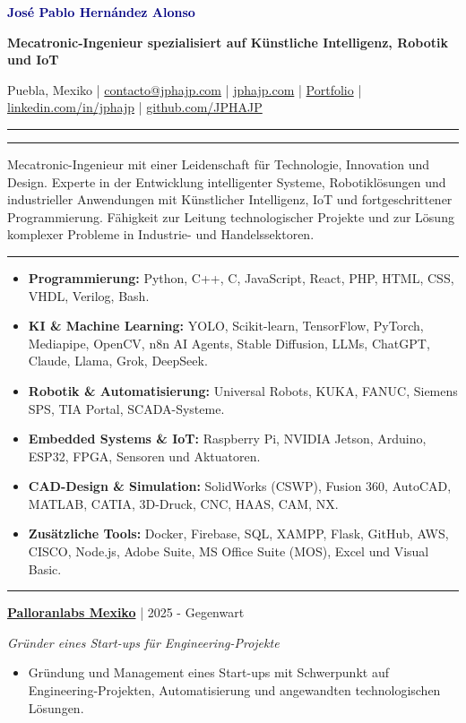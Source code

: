 \documentclass[10pt,letterpaper]{article}
\newcommand{\sectionline}{\vspace{-2pt}\textcolor{accent}{\rule{\linewidth}{0.8pt}}\vspace{1pt}}
\newcommand{\cvsection}[1]{\vspace{5pt}{\large\bfseries\textcolor{navy}{#1}}\par\sectionline}
\newcommand{\entry}[3]{\textbf{#1} \textcolor{muted}{| #2}\par\textit{#3}\par}
\begin{document}
\color{text}

{\Huge\bfseries\textcolor{navy}{Jos\'{e} Pablo Hern\'{a}ndez Alonso}}\par
{\large\bfseries Mecatronic-Ingenieur spezialisiert auf K\"{u}nstliche Intelligenz, Robotik und IoT}\par
\vspace{2pt}
Puebla, Mexiko \; | \; \href{mailto:contacto@jphajp.com}{contacto@jphajp.com} \; | \; \href{https://jphajp.com/}{jphajp.com} \; | \; \href{https://jphajp.github.io/JPHAJP/}{Portfolio} \; | \; \href{https://www.linkedin.com/in/jphajp}{linkedin.com/in/jphajp} \; | \; \href{https://github.com/JPHAJP}{github.com/JPHAJP}
\par\vspace{3pt}\textcolor{accent}{\rule{\linewidth}{1.8pt}}

\cvsection{Berufsprofil}
Mecatronic-Ingenieur mit einer Leidenschaft f\"{u}r Technologie, Innovation und Design. Experte in der Entwicklung intelligenter Systeme, Robotikl\"{o}sungen und industrieller Anwendungen mit K\"{u}nstlicher Intelligenz, IoT und fortgeschrittener Programmierung. F\"{a}higkeit zur Leitung technologischer Projekte und zur L\"{o}sung komplexer Probleme in Industrie- und Handelssektoren.

\cvsection{Technische Kompetenzen}
\begin{itemize}
  \item \textbf{Programmierung:} Python, C++, C, JavaScript, React, PHP, HTML, CSS, VHDL, Verilog, Bash.
  \item \textbf{KI \& Machine Learning:} YOLO, Scikit-learn, TensorFlow, PyTorch, Mediapipe, OpenCV, n8n AI Agents, Stable Diffusion, LLMs, ChatGPT, Claude, Llama, Grok, DeepSeek.
  \item \textbf{Robotik \& Automatisierung:} Universal Robots, KUKA, FANUC, Siemens SPS, TIA Portal, SCADA-Systeme.
  \item \textbf{Embedded Systems \& IoT:} Raspberry Pi, NVIDIA Jetson, Arduino, ESP32, FPGA, Sensoren und Aktuatoren.
  \item \textbf{CAD-Design \& Simulation:} SolidWorks (CSWP), Fusion 360, AutoCAD, MATLAB, CATIA, 3D-Druck, CNC, HAAS, CAM, NX.
  \item \textbf{Zus\"{a}tzliche Tools:} Docker, Firebase, SQL, XAMPP, Flask, GitHub, AWS, CISCO, Node.js, Adobe Suite, MS Office Suite (MOS), Excel und Visual Basic.
\end{itemize}

\cvsection{Berufserfahrung}
\entry{\href{https://www.palloranlabs.com/}{Palloranlabs Mexiko}}{2025 - Gegenwart}{Gr\"{u}nder eines Start-ups f\"{u}r Engineering-Projekte}
\begin{itemize}
  \item Gr\"{u}ndung und Management eines Start-ups mit Schwerpunkt auf Engineering-Projekten, Automatisierung und angewandten technologischen L\"{o}sungen.
\end{itemize}
\end{document}
